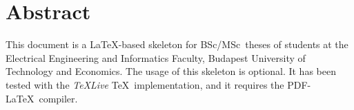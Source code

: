 \chapter*{Abstract}

This document is a \LaTeX-based skeleton for BSc/MSc~theses of students at the Electrical Engineering and Informatics Faculty, Budapest University of Technology and Economics. The usage of this skeleton is optional. It has been tested with the \emph{TeXLive} \TeX~implementation, and it requires the PDF-\LaTeX~compiler.


\vfill
\selectthesislanguage

\setcounter{romanPage}{\value{page}}
